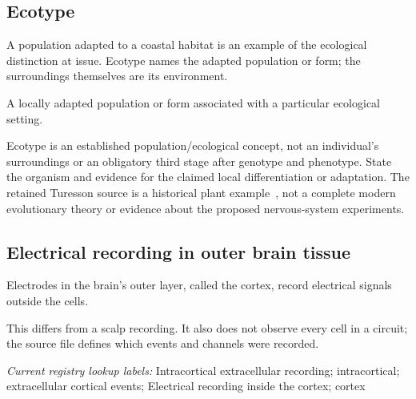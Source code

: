 \subsection*{Ecotype}
\noindent A population adapted to a coastal habitat is an example of the ecological distinction at issue. Ecotype names the adapted population or form; the surroundings themselves are its environment.\par
\noindent A locally adapted population or form associated with a particular ecological setting.\par
\noindent Ecotype is an established population/ecological concept, not an individual’s surroundings or an obligatory third stage after genotype and phenotype. State the organism and evidence for the claimed local differentiation or adaptation. The retained Turesson source is a historical plant example~\citep{turesson1922ecotype}, not a complete modern evolutionary theory or evidence about the proposed nervous-system experiments.\par

\begin{samepage}
\subsection*{Electrical recording in outer brain tissue}
\noindent Electrodes in the brain’s outer layer, called the cortex, record electrical signals outside the cells.\par
\end{samepage}
\begin{samepage}
\noindent This differs from a scalp recording. It also does not observe every cell in a circuit; the source file defines which events and channels were recorded.\par\nopagebreak[4]

\end{samepage}


\noindent\textit{Current registry lookup labels:} Intracortical extracellular recording; intracortical; extracellular cortical events; Electrical recording inside the cortex; cortex\par

